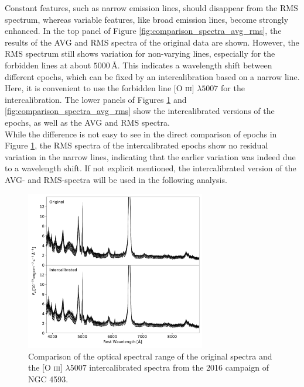Constant features, such as narrow emission lines, should disappear from the RMS spectrum, whereas variable features, like broad emission lines, become strongly enhanced. In the top panel of Figure \ref{fig:comparison_spectra_avg_rms}, the results of the AVG and RMS spectra of the original data are shown. However, the RMS spectrum still shows variation for non-varying lines, especially for the forbidden lines at about $5000\,\text{\AA}$. This indicates a wavelength shift between different epochs, which can be fixed by an intercalibration based on a narrow line. Here, it is convenient to use the forbidden line [O \textsc{iii}] $\lambda5007$ for the intercalibration. The lower panels of Figures \ref{fig:comparison_spectra} and \ref{fig:comparison_spectra_avg_rms} show the intercalibrated versions of the epochs, as well as the AVG and RMS spectra.\\
While the difference is not easy to see in the direct comparison of epochs in Figure \ref{fig:comparison_spectra}, the RMS spectra of the intercalibrated epochs show no residual variation in the narrow lines, indicating that the earlier variation was indeed due to a wavelength shift. If not explicit mentioned, the intercalibrated version of the AVG- and RMS-spectra will be used in the following analysis.
\newpage
\begin{figure}[!ht]
	\centering
	\includegraphics[width=0.7\textwidth]{pictures/Chapter3/comparison_spectra}
	\caption{Comparison of the optical spectral range of the original spectra and the [O \textsc{iii}] $\lambda5007$ intercalibrated spectra from the 2016 campaign of NGC 4593.}
	\label{fig:comparison_spectra}
\end{figure}




